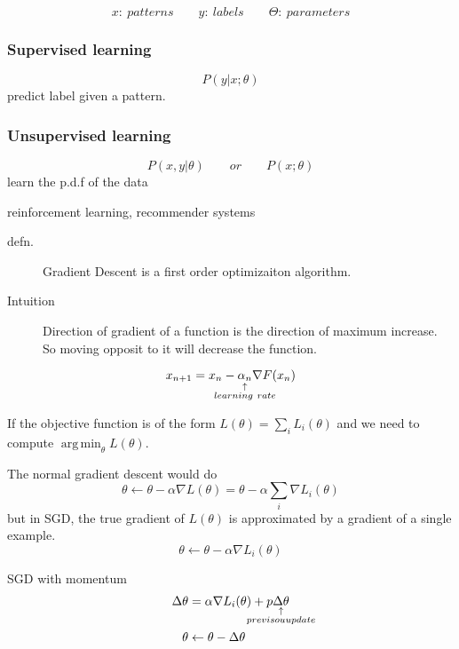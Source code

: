 \begin{slide}[Basics]
  $$x:~patterns \qquad y:~labels \qquad \Theta:~parameters$$
  \begin{multicols}{2}
    \subsubsection*{Supervised learning}
      $$P(y|x;\theta)$$
      predict label given a pattern.
    \subsubsection*{Unsupervised learning}
      $$P(x,y |\theta) \qquad or \qquad P(x;\theta)  $$
      learn the p.d.f of the data
  \end{multicols}
  reinforcement learning, recommender systems
\end{slide}
\begin{slide}
  \begin{description}
    \item[defn.]Gradient Descent is a first order optimizaiton algorithm. 
    \item[Intuition] Direction of gradient of a function is the direction of maximum increase. So moving opposit to it will decrease the function.
  \end{description}
  $$x_{n+1} = x_n - \explain{\alpha_n}{learning~rate} \nabla F(x_n)$$

\end{slide}
\begin{slide}
  If the objective function is of the form $L(\theta) = \sum_iL_i(\theta)$ and we need to compute $\mathop{\mathrm{arg\,min}}_\theta L(\theta)$.
  
  
  The normal gradient descent would do
  $$\theta \gets \theta - \alpha \nabla L(\theta) = \theta-\alpha\sum_i\nabla L_i(\theta)$$
  but in SGD, the true gradient of $L(\theta)$ is approximated by a gradient of a single example.
  $$\theta \gets \theta - \alpha\nabla L_i(\theta)$$

  SGD with momentum
  \begin{align*}
   \grad \theta &= \alpha \nabla L_i(\theta) + p \explain{\grad \theta}{previsou update}
   \\
   \theta&\gets \theta -\grad \theta
  \end{align*}
\end{slide}
